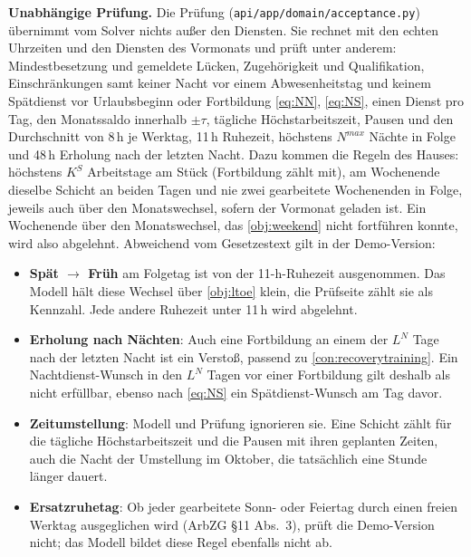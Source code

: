 \documentclass[11pt]{combiArticle}
\newcommand{\code}[1]{\texttt{#1}}
\begin{document}
\textbf{Unabhängige Prüfung.} Die Prüfung (\code{api/app/domain/acceptance.py}) übernimmt vom Solver nichts außer
den Diensten. Sie rechnet mit den echten Uhrzeiten und den Diensten des Vormonats und prüft unter anderem:
Mindestbesetzung und gemeldete Lücken, Zugehörigkeit und Qualifikation, Einschränkungen samt keiner Nacht vor einem
Abwesenheitstag und keinem Spätdienst vor Urlaubsbeginn oder Fortbildung \eqref{eq:NN}, \eqref{eq:NS}, einen Dienst
pro Tag,
den Monatssaldo innerhalb $\pm\tau$, tägliche Höchstarbeitszeit, Pausen und den Durchschnitt von 8\,h je Werktag,
11\,h Ruhezeit, höchstens $N^{max}$ Nächte in Folge und 48\,h Erholung nach der letzten Nacht. Dazu kommen die
Regeln des Hauses: höchstens $K^{S}$ Arbeitstage am Stück (Fortbildung zählt mit), am Wochenende dieselbe Schicht an
beiden Tagen und nie zwei gearbeitete Wochenenden in Folge, jeweils auch über den Monatswechsel, sofern der
Vormonat geladen ist. Ein Wochenende über den Monatswechsel, das \eqref{obj:weekend} nicht fortführen konnte, wird
also abgelehnt. Abweichend vom Gesetzestext gilt in der Demo-Version:
\begin{itemize}
  \item \textbf{Spät $\to$ Früh} am Folgetag ist von der 11-h-Ruhezeit ausgenommen. Das Modell hält diese Wechsel
        über \eqref{obj:ltoe} klein, die Prüfseite zählt sie als Kennzahl. Jede andere Ruhezeit unter 11\,h wird
        abgelehnt.
  \item \textbf{Erholung nach Nächten}: Auch eine Fortbildung an einem der $L^{N}$ Tage nach der letzten Nacht
        ist ein Verstoß, passend zu \eqref{con:recoverytraining}. Ein Nachtdienst-Wunsch in den $L^{N}$ Tagen vor
        einer Fortbildung gilt deshalb als nicht erfüllbar, ebenso nach \eqref{eq:NS} ein Spätdienst-Wunsch am Tag
        davor.
  \item \textbf{Zeitumstellung}: Modell und Prüfung ignorieren sie. Eine Schicht zählt für die tägliche
        Höchstarbeitszeit und die Pausen mit ihren geplanten Zeiten, auch die Nacht der Umstellung im Oktober,
        die tatsächlich eine Stunde länger dauert.
  \item \textbf{Ersatzruhetag}: Ob jeder gearbeitete Sonn- oder Feiertag durch einen freien Werktag ausgeglichen
        wird (ArbZG §11 Abs.~3), prüft die Demo-Version nicht; das Modell bildet diese Regel ebenfalls nicht ab.
\end{itemize}
\end{document}
